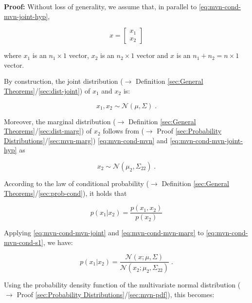 \documentclass[a4paper,12pt,twoside]{book}
\begin{document}
\vspace{1em}
\textbf{Proof:} Without loss of generality, we assume that, in parallel to \eqref{eq:mvn-cond-mvn-joint-hyp},

\begin{equation} \label{eq:mvn-cond-x}
x = \begin{bmatrix} x_1 \\ x_2 \end{bmatrix}
\end{equation}

where $x_1$ is an $n_1 \times 1$ vector, $x_2$ is an $n_2 \times 1$ vector and $x$ is an $n_1 + n_2 = n \times 1$ vector.

\vspace{1em}
By construction, the joint distribution ($\rightarrow$ Definition \ref{sec:General Theorems}/\ref{sec:dist-joint}) of $x_1$ and $x_2$ is:

\begin{equation} \label{eq:mvn-cond-mvn-joint}
x_1,x_2 \sim \mathcal{N}(\mu, \Sigma) \; .
\end{equation}

Moreover, the marginal distribution ($\rightarrow$ Definition \ref{sec:General Theorems}/\ref{sec:dist-marg}) of $x_2$ follows from ($\rightarrow$ Proof \ref{sec:Probability Distributions}/\ref{sec:mvn-marg}) \eqref{eq:mvn-cond-mvn} and \eqref{eq:mvn-cond-mvn-joint-hyp} as

\begin{equation} \label{eq:mvn-cond-mvn-marg}
x_2 \sim \mathcal{N}(\mu_2, \Sigma_{22}) \; .
\end{equation}

According to the law of conditional probability ($\rightarrow$ Definition \ref{sec:General Theorems}/\ref{sec:prob-cond}), it holds that

\begin{equation} \label{eq:mvn-cond-mvn-cond-s1}
p(x_1|x_2) = \frac{p(x_1,x_2)}{p(x_2)}
\end{equation}

Applying \eqref{eq:mvn-cond-mvn-joint} and \eqref{eq:mvn-cond-mvn-marg} to \eqref{eq:mvn-cond-mvn-cond-s1}, we have:

\begin{equation} \label{eq:mvn-cond-mvn-cond-s2}
p(x_1|x_2) = \frac{\mathcal{N}(x; \mu, \Sigma)}{\mathcal{N}(x_2; \mu_2, \Sigma_{22})} \; .
\end{equation}

Using the probability density function of the multivariate normal distribution ($\rightarrow$ Proof \ref{sec:Probability Distributions}/\ref{sec:mvn-pdf}), this becomes:
\end{document}
